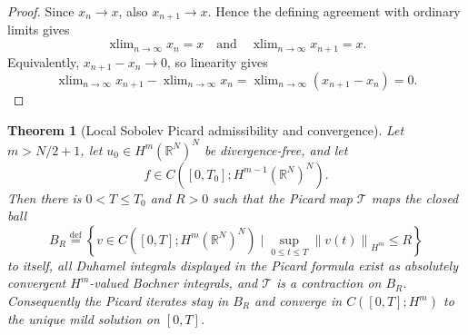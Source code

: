 \documentclass{amsart}
\newtheorem{thm}{Theorem}
\newcommand{\setcond}[2]{\left\{ #1 \mid #2 \right\}}
\DeclareMathOperator{\xlim}{xlim}
\newcommand{\eqdef}{\overset{\mathrm{def}}{=}}
\newcommand{\norm}[1]{\left\lVert #1\right\rVert}
\begin{document}
\begin{proof}
Since $x_n\to x$, also $x_{n+1}\to x$.  Hence the defining agreement with
ordinary limits gives
\[
  \xlim_{n\to\infty}x_n=x
  \quad\text{and}\quad
  \xlim_{n\to\infty}x_{n+1}=x.
\]
Equivalently, $x_{n+1}-x_n\to0$, so linearity gives
\[
  \xlim_{n\to\infty}x_{n+1}-\xlim_{n\to\infty}x_n
  =
  \xlim_{n\to\infty}(x_{n+1}-x_n)=0.
\]
\end{proof}

\begin{thm}[Local Sobolev Picard admissibility and convergence]
\label{thm:local-sobolev-picard}
Let $m>N/2+1$, let
$u_0\in H^m(\mathbb{R}^N)^N$ be divergence-free, and let
\[
  f\in C([0,T_0];H^{m-1}(\mathbb{R}^N)^N).
\]
Then there is $0<T\leq T_0$ and $R>0$ such that the Picard map
$\mathcal T$ maps the closed ball
\[
  B_R\eqdef
  \setcond{v\in C([0,T];H^m(\mathbb{R}^N)^N)}
  {\sup_{0\leq t\leq T}\norm{v(t)}_{H^m}\leq R}
\]
to itself, all Duhamel integrals displayed in the Picard formula exist as
absolutely convergent $H^m$-valued Bochner integrals, and
$\mathcal T$ is a contraction on $B_R$.  Consequently the Picard iterates stay
in $B_R$ and converge in $C([0,T];H^m)$ to the unique mild solution on
$[0,T]$.
\end{thm}
\end{document}
